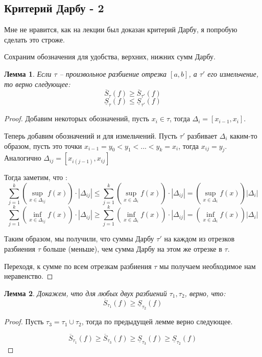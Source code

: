 \documentclass{article}
\theoremstyle{plain}
\newtheorem{lemma}{Лемма}
\theoremstyle{definition}
\theoremstyle{remark}
\renewcommand{\*}{\cdot}
\begin{document}
\subsection{Критерий Дарбу - 2}
Мне не нравится, как на лекции был доказан критерий Дарбу, я попробую сделать это строже.

Сохраним обозначения для удобства, верхних, нижних сумм Дарбу.

\begin{lemma}
    Если $\tau$ -- произвольное разбиение отрезка $[a,b]$, а $\tau'$ его измельчение, то верно следующее:
    \[
        \overline{S}_{\tau}(f) \geq \overline{S}_{\tau'}(f)
    \]
    \[
        \underline{S}_{\tau}(f) \leq \underline{S}_{\tau'}(f)
    \]
\end{lemma}

\begin{proof}
    Добавим некоторых обозначений, пусть $x_i \in \tau$, тогда $\Delta_i = [x_{i-1}, x_i]$.

    Теперь добавим обозначений и для измельчений. Пусть $\tau'$ разбивает $\Delta_i$ каким-то образом,
    пусть это точки $x_{i-1} = y_0 < y_1 < ... < y_k = x_{i}$, тогда $x_{ij} = y_j$. Аналогично $\Delta_{ij} = [x_{i (j-1)}, x_{ij}]$

    Тогда заметим, что :
    \[
        \sum_{j = 1}^k \left(\sup_{x \in \Delta_{ij}}f(x)\right)  \* |\Delta_{ij}| \leq 
        \sum_{j = 1}^k \left(\sup_{x \in \Delta_{i}} f(x)\right) \* |\Delta_{ij}|
        = \left(\sup_{x \in \Delta_{i}} f(x)\right) |\Delta_i|
    \]
    \[
        \sum_{j = 1}^k \left(\inf_{x \in \Delta_{ij}}f(x)\right)  \* |\Delta_{ij}| \geq 
        \sum_{j = 1}^k \left(\inf_{x \in \Delta_{i}} f(x)\right) \* |\Delta_{ij}|
        = \left(\inf_{x \in \Delta_{i}} f(x)\right) |\Delta_i|
    \]
    
    Таким образом, мы получили, что суммы Дарбу $\tau'$ на каждом из отрезков 
    разбиения $\tau$ больше (меньше), чем сумма Дарбу на этом же отрезке в $\tau$.

    Переходя, к сумме по всем отрезкам разбиения $\tau$ мы получаем необходимое нам неравенство.
\end{proof}

\begin{lemma}
    Докажем, что для любых двух разбиений $\tau_1, \tau_2$, верно, что:
   \[
       \overline{S}_{\tau_1}(f) \geq \underline{S}_{\tau_2} (f)
    \]
\end{lemma}

\begin{proof}
    Пусть $\tau_3 = \tau_1 \cup \tau_2$, тогда по предыдущей лемме верно следующее.

    \[
       \overline{S}_{\tau_1}(f) \geq \overline{S}_{\tau_3}(f) \geq \underline{S}_{\tau_3}(f) \geq \underline{S}_{\tau_2} (f)
    \]

\end{proof}
\end{document}
